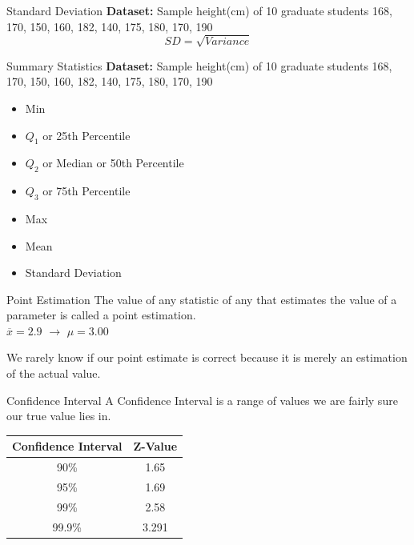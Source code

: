 \documentclass[10pt,dvipsnames, aspectratio=169]{beamer}
\begin{document}
\begin{frame}[t]{Standard Deviation}
	\textbf{Dataset:} Sample height(cm) of 10 graduate students 168, 170, 
	150, 160, 182, 140, 175, 180, 170, 190
	$$
	SD = \sqrt{Variance}
	$$ 
\end{frame}

\begin{frame}[t]{Summary Statistics}
	\textbf{Dataset:} Sample height(cm) of 10 graduate students 168, 170, 
	150, 160, 182, 140, 175, 180, 170, 190
	
	\begin{itemize}
		\item Min
		\item $Q_1$ or 25th Percentile 
		\item $Q_2$ or Median or 50th Percentile
		\item $Q_3$ or 75th Percentile 
		\item Max
		\item Mean 
		\item Standard Deviation
	\end{itemize}
\end{frame}
\begin{frame}[t]{Point Estimation}
	The value of any statistic of any that estimates the value of a parameter 
	is called a point estimation. \\ 
	$\overline{x} = 2.9$ $\rightarrow$ $\mu = 3.00$
	
	We rarely know if our point estimate is correct because it is merely an 
	estimation of the actual value.
\end{frame}


\begin{frame}[t]{Confidence Interval}
	A Confidence Interval is a range of values we are fairly sure our true 
	value lies in. \\ 
	\begin{center}
		\begin{tabular}{|c|c|}
			\hline 
			Confidence Interval & Z-Value \\ 
			\hline 
			90\% & 1.65 \\ 
			\hline 
			95\% & 1.69 \\ 
			\hline 
			99\% & 2.58 \\ 
			\hline 
			99.9\% & 3.291 \\ 
			\hline 
		\end{tabular}
	\end{center}
\end{frame}
\end{document}

